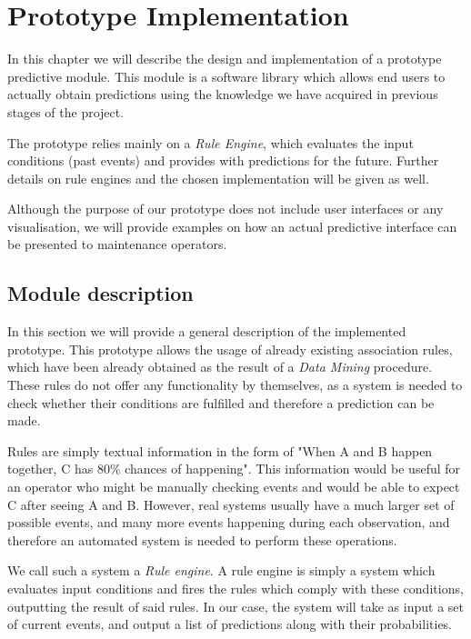 \chapter{Prototype Implementation}
\begin{chapterintro}
In this chapter we will describe the design and implementation of a prototype predictive module. This module is a software library which allows end users to actually obtain predictions using the knowledge we have acquired in previous stages of the project.

The prototype relies mainly on a \emph{Rule Engine}, which evaluates the input conditions (past events) and provides with predictions for the future. Further details on rule engines and the chosen implementation will be given as well.

Although the purpose of our prototype does not include user interfaces or any visualisation, we will provide examples on how an actual predictive interface can be presented to maintenance operators.
\end{chapterintro}

\label{chap:prototype}
\section{Module description}
\label{sec:module_description}
In this section we will provide a general description of the implemented prototype. This prototype allows the usage of already existing association rules, which have been already obtained as the result of a \emph{Data Mining}\cite{torgo2003data}\cite{han2006data} procedure. These rules do not offer any functionality by themselves, as a system is needed to check whether their conditions are fulfilled and therefore a prediction can be made.

Rules are simply textual information in the form of "When A and B happen together, C has 80\% chances of happening". This information would be useful for an operator who might be manually checking events and would be able to expect C after seeing A and B. However, real systems usually have a much larger set of possible events, and many more events happening during each observation, and therefore an automated system is needed to perform these operations.

We call such a system a \emph{Rule engine}\cite{liang2009openrulebench}. A rule engine is simply a system which evaluates input conditions and fires the rules which comply with these conditions, outputting the result of said rules. In our case, the system will take as input a set of current events, and output a list of predictions along with their probabilities.


